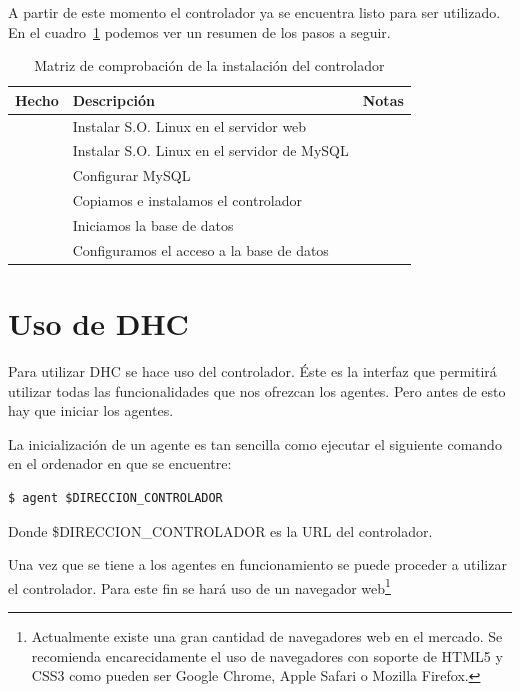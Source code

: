 A partir de este momento el controlador ya se encuentra listo para ser utilizado. En el cuadro~\ref{tab:mat_controlador} podemos ver un resumen de los pasos a seguir.

\begin{table}
	\centering
	
	\begin{tabular}{|c|p{5.6cm}|p{5.6cm}|}
	\hline
	Hecho & Descripción & Notas\\
	\hline
	& Instalar S.O. Linux en el servidor web & \\
	\hline
	& Instalar S.O. Linux en el servidor de MySQL & \\
	\hline
	& Configurar MySQL & \\
	\hline
	& Copiamos e instalamos el controlador & \\
	\hline
	& Iniciamos la base de datos & \\
	\hline
	& Configuramos el acceso a la base de datos & \\
	\hline
	\end{tabular}
	
	\caption{Matriz de comprobación de la instalación del controlador}\label{tab:mat_controlador}
\end{table}

\section{Uso de DHC}

Para utilizar DHC se hace uso del controlador. Éste es la interfaz que permitirá utilizar todas las funcionalidades que nos ofrezcan los agentes. Pero antes de esto hay que iniciar los agentes.

La inicialización de un agente es tan sencilla como ejecutar el siguiente comando en el ordenador en que se encuentre:

\begin{verbatim}
$ agent $DIRECCION_CONTROLADOR
\end{verbatim}

Donde \$DIRECCION\_CONTROLADOR es la URL del controlador.

Una vez que se tiene a los agentes en funcionamiento se puede proceder a utilizar el controlador. Para este fin se hará uso de un navegador web\footnote{Actualmente existe una gran cantidad de navegadores web en el mercado. Se recomienda encarecidamente el uso de navegadores con soporte de HTML5 y CSS3 como pueden ser Google Chrome, Apple Safari o Mozilla Firefox.}

